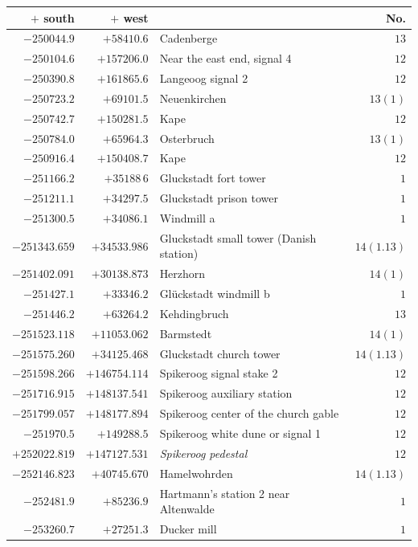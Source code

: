 \begin{center}\begingroup\fontsize{8}{9}\selectfont
\setlength{\tabcolsep}{4pt}
\begin{tabular}{r|r|p{170pt}|r}\hline
\(+\) south&\(+\) west&&No.\\\hline
\(-250044.9\)&\(+58410.6\)&Cadenberge&\(13\)\\
\(-250104.6\)&\(+157206.0\)&Near the east end, signal 4&\(12\)\\
\(-250390.8\)&\(+161865.6\)&Langeoog signal 2&\(12\)\\
\(-250723.2\)&\(+69101.5\)&Neuenkirchen&\(13(1)\)\\
\(-250742.7\)&\(+150281.5\)&Kape&\(12\)\\
\(-250784.0\)&\(+65964.3\)&Osterbruch&\(13(1)\)\\
\(-250916.4\)&\(+150408.7\)&Kape&\(12\)\\
\(-251166.2\)&\(+35188\,6\)&Gluckstadt fort tower&\(1\)\\
\(-251211.1\)&\(+34297.5\)&Gluckstadt prison tower&\(1\)\\
\(-251300.5\)&\(+34086.1\)&Windmill a&\(1\)\\
\(-251343.659\)&\(+34533.986\)&Gluckstadt small tower (Danish station)&\(14(1.13)\)\\
\(-251402.091\)&\(+30138.873\)&Herzhorn&\(14(1)\)\\
\(-251427.1\)&\(+33346.2\)&Glückstadt windmill b&\(1\)\\
\(-251446.2\)&\(+63264.2\)&Kehdingbruch&\(13\)\\
\(-251523.118\)&\(+11053.062\)&Barmstedt&\(14(1)\)\\
\(-251575.260\)&\(+34125.468\)&Gluckstadt church tower&\(14(1.13)\)\\
\(-251598.266\)&\(+146754.114\)&Spikeroog signal stake 2&\(12\)\\
\(-251716.915\)&\(+148137.541\)&Spikeroog auxiliary station&\(12\)\\
\(-251799.057\)&\(+148177.894\)&Spikeroog center of the church gable&\(12\)\\
\(-251970.5\)&\(+149288.5\)&Spikeroog white dune or signal 1&\(12\)\\
\(+252022.819\)&\(+147127.531\)&\textit{Spikeroog pedestal}&\(12\)\\
\(-252146.823\)&\(+40745.670\)&Hamelwohrden&\(14(1.13)\)\\
\(-252481.9\)&\(+85236.9\)&Hartmann’s station 2 near Altenwalde&\(1\)\\
\(-253260.7\)&\(+27251.3\)&Ducker mill&\(1\)\\

\end{tabular}
\end{center}

